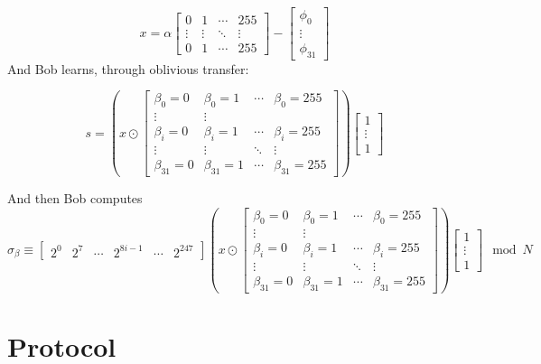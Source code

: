 \documentclass{article}
\begin{document}
$$ x = \alpha \begin{bmatrix}
0 & 1& \cdots & 255\\
\vdots &\vdots & \ddots & \vdots\\
0 & 1 & \cdots & 255
\end{bmatrix} - \begin{bmatrix}
\phi_0 \\
\vdots\\
\phi_{31}
\end{bmatrix}
$$
And Bob learns, through oblivious transfer:

$$s = 
\left(x \odot \begin{bmatrix}
\beta_0 = 0 & \beta_0 = 1  & \cdots & \beta_0 = 255 \\
\vdots & \vdots \\
\beta_i = 0 & \beta_i = 1 & \cdots & \beta_i = 255  \\
\vdots & \vdots & \ddots & \vdots \\
\beta_{31} = 0 & \beta_{31} = 1 & \cdots & \beta_{31} = 255
\end{bmatrix}\right)
\begin{bmatrix}
1 \\ \vdots \\ 1
\end{bmatrix}
$$

And then Bob computes
$$\sigma_{\beta} \equiv 
\begin{bmatrix}
2^0 & 2^7 &\cdots& 2^{8i -1} & \cdots& 2^{247}
\end{bmatrix}
\left(x \odot \begin{bmatrix}
\beta_0 = 0 & \beta_0 = 1  & \cdots & \beta_0 = 255 \\
\vdots & \vdots \\
\beta_i = 0 & \beta_i = 1 & \cdots & \beta_i = 255  \\
\vdots & \vdots & \ddots & \vdots \\
\beta_{31} = 0 & \beta_{31} = 1 & \cdots & \beta_{31} = 255
\end{bmatrix}\right)
\begin{bmatrix}
1 \\ \vdots \\ 1
\end{bmatrix} \mod N$$






\section{Protocol}
\end{document}
